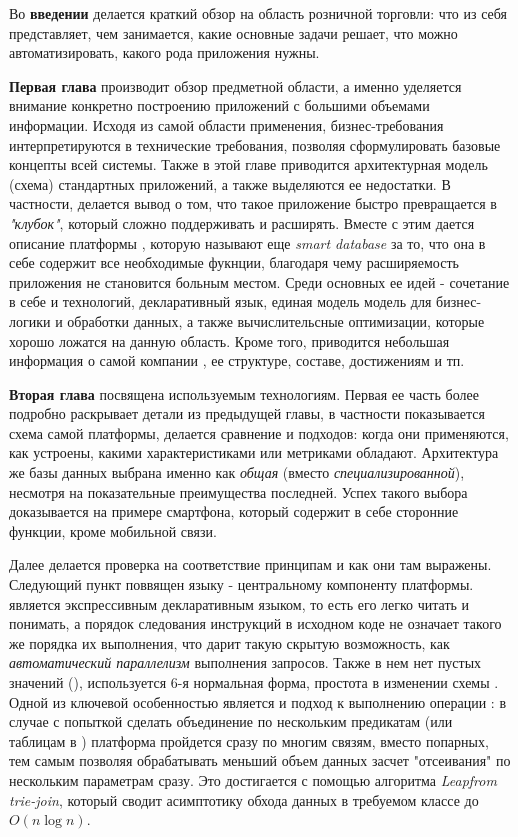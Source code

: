 
Во \textbf{введении} делается краткий обзор на область розничной торговли: что из себя представляет, чем занимается, какие основные задачи решает, что можно автоматизировать, какого рода приложения нужны.

\textbf{Первая глава} производит обзор предметной области, а именно уделяется внимание конкретно построению приложений с большими объемами информации. Исходя из самой области применения, бизнес-требования интерпретируются в технические требования, позволяя сформулировать базовые концепты всей системы. Также в этой главе приводится архитектурная модель (схема) стандартных приложений, а также выделяются ее недостатки. В частности, делается вывод о том, что такое приложение быстро превращается в \emph{"клубок"}, который сложно поддерживать и расширять. Вместе с этим дается описание платформы \LB, которую называют еще \emph{smart database} за то, что она в себе содержит все необходимые фукнции, благодаря чему расширяемость приложения не становится больным местом. Среди основных ее идей - сочетание в себе \olap и \oltp технологий, декларативный язык, единая модель модель для бизнес-логики и обработки данных, а также вычислительсные оптимизации, которые хорошо ложатся на данную область. Кроме того, приводится небольшая информация о самой компании \LB, ее структуре, составе, достижениям и тп.

\textbf{Вторая глава} посвящена используемым технологиям. Первая ее часть более подробно раскрывает детали из предыдущей главы, в частности показывается схема самой платформы, делается сравнение \oltp и \olap подходов: когда они применяются, как устроены, какими характеристиками или метриками обладают. Архитектура же базы данных \LB выбрана именно как \emph{общая} (вместо \emph{специализированной}), несмотря на показательные преимущества последней. Успех такого выбора доказывается на примере смартфона, который содержит в себе сторонние функции, кроме мобильной связи.

Далее делается проверка \LB \dbr на соответствие принципам \acid и как они там выражены. Следующий пункт поввящен языку \logiql - центральному компоненту платформы. \logiql является экспрессивным декларативным языком, то есть его легко читать и понимать, а порядок следования инструкций в исходном коде не означает такого же порядка их выполнения, что дарит такую скрытую возможность, как \emph{автоматический параллелизм} выполнения запросов. Также в нем нет пустых значений (\null), используется 6-я нормальная форма, простота в изменении схемы \dbr. Одной из ключевой особенностью является и подход к выполнению операции \join: в случае с попыткой сделать объединение по нескольким предикатам (или таблицам в \sql) платформа \LB пройдется сразу по многим связям, вместо попарных, тем самым позволяя обрабатывать меньший объем данных засчет "отсеивания" по нескольким параметрам сразу. Это достигается с помощью алгоритма \emph{Leapfrom trie-join}, который сводит асимптотику обхода данных в требуемом классе до $O(n\log n)$.

